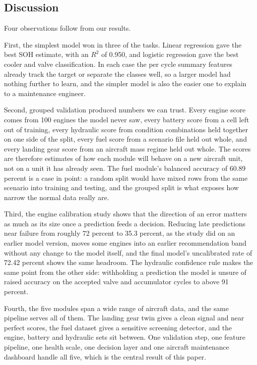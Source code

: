 \documentclass[conference]{IEEEtran}
\begin{document}
\subsection{Discussion}
Four observations follow from our results.

First, the simplest model won in three of the tasks. Linear regression gave the best SOH estimate, with an $R^2$ of 0.950, and logistic regression gave the best cooler and valve classification. In each case the per cycle summary features already track the target or separate the classes well, so a larger model had nothing further to learn, and the simpler model is also the easier one to explain to a maintenance engineer.

Second, grouped validation produced numbers we can trust. Every engine score comes from 100 engines the model never saw, every battery score from a cell left out of training, every hydraulic score from condition combinations held together on one side of the split, every fuel score from a scenario file held out whole, and every landing gear score from an aircraft mass regime held out whole. The scores are therefore estimates of how each module will behave on a new aircraft unit, not on a unit it has already seen. The fuel module's balanced accuracy of 60.89 percent is a case in point: a random split would have mixed rows from the same scenario into training and testing, and the grouped split is what exposes how narrow the normal data really are.

Third, the engine calibration study shows that the direction of an error matters as much as its size once a prediction feeds a decision. Reducing late predictions near failure from roughly 72 percent to 35.3 percent, as the study did on an earlier model version, moves some engines into an earlier recommendation band without any change to the model itself, and the final model's uncalibrated rate of 72.42 percent shows the same headroom. The hydraulic confidence rule makes the same point from the other side: withholding a prediction the model is unsure of raised accuracy on the accepted valve and accumulator cycles to above 91 percent.

Fourth, the five modules span a wide range of aircraft data, and the same pipeline serves all of them. The landing gear twin gives a clean signal and near perfect scores, the fuel dataset gives a sensitive screening detector, and the engine, battery and hydraulic sets sit between. One validation step, one feature pipeline, one health scale, one decision layer and one aircraft maintenance dashboard handle all five, which is the central result of this paper.
\end{document}
